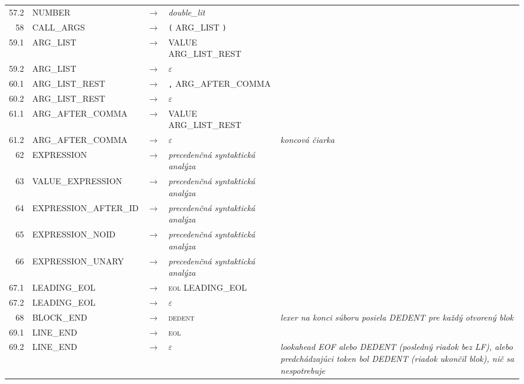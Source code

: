 \documentclass[11pt,a4paper]{article}
\begin{document}
{\begin{longtable}{r l c >{\raggedright\arraybackslash}p{6.6cm} >{\raggedright\arraybackslash}p{3.2cm}}
57.2 & \textsf{NUMBER} & $\rightarrow$ & \textit{double\_lit} & {\scriptsize } \\
58 & \textsf{CALL\_ARGS} & $\rightarrow$ & \texttt{(} \textsf{ARG\_LIST} \texttt{)} & {\scriptsize } \\
59.1 & \textsf{ARG\_LIST} & $\rightarrow$ & \textsf{VALUE} \textsf{ARG\_LIST\_REST} & {\scriptsize } \\
59.2 & \textsf{ARG\_LIST} & $\rightarrow$ & $\varepsilon$ & {\scriptsize } \\
60.1 & \textsf{ARG\_LIST\_REST} & $\rightarrow$ & \texttt{,} \textsf{ARG\_AFTER\_COMMA} & {\scriptsize } \\
60.2 & \textsf{ARG\_LIST\_REST} & $\rightarrow$ & $\varepsilon$ & {\scriptsize } \\
61.1 & \textsf{ARG\_AFTER\_COMMA} & $\rightarrow$ & \textsf{VALUE} \textsf{ARG\_LIST\_REST} & {\scriptsize } \\
61.2 & \textsf{ARG\_AFTER\_COMMA} & $\rightarrow$ & $\varepsilon$ & {\scriptsize \textit{koncová čiarka}} \\
62 & \textsf{EXPRESSION} & $\rightarrow$ & \textit{precedenčná syntaktická analýza} & \\
63 & \textsf{VALUE\_EXPRESSION} & $\rightarrow$ & \textit{precedenčná syntaktická analýza} & \\
64 & \textsf{EXPRESSION\_AFTER\_ID} & $\rightarrow$ & \textit{precedenčná syntaktická analýza} & \\
65 & \textsf{EXPRESSION\_NOID} & $\rightarrow$ & \textit{precedenčná syntaktická analýza} & \\
66 & \textsf{EXPRESSION\_UNARY} & $\rightarrow$ & \textit{precedenčná syntaktická analýza} & \\
67.1 & \textsf{LEADING\_EOL} & $\rightarrow$ & \textsc{eol} \textsf{LEADING\_EOL} & {\scriptsize } \\
67.2 & \textsf{LEADING\_EOL} & $\rightarrow$ & $\varepsilon$ & {\scriptsize } \\
68 & \textsf{BLOCK\_END} & $\rightarrow$ & \textsc{dedent} & {\scriptsize \textit{lexer na konci súboru posiela DEDENT pre každý otvorený blok}} \\
69.1 & \textsf{LINE\_END} & $\rightarrow$ & \textsc{eol} & {\scriptsize } \\
69.2 & \textsf{LINE\_END} & $\rightarrow$ & $\varepsilon$ & {\scriptsize \textit{lookahead EOF alebo DEDENT (posledný riadok bez LF), alebo predchádzajúci token bol DEDENT (riadok ukončil blok), nič sa nespotrebuje}} \\
\end{longtable}
}
 
\end{document}
